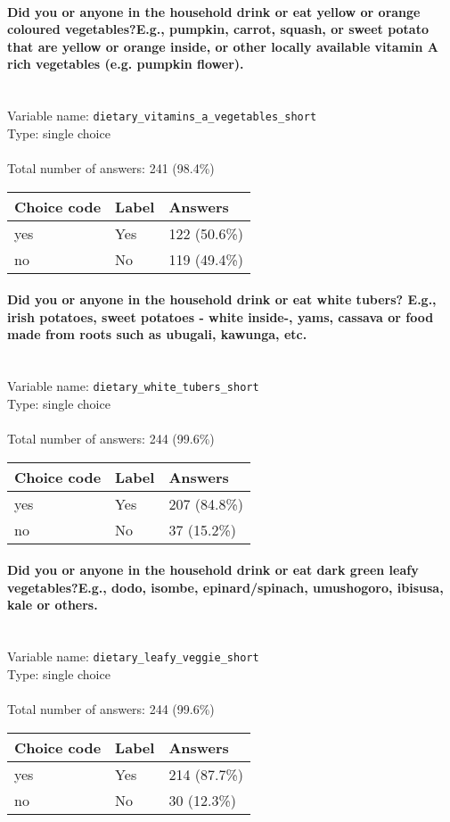 \documentclass[11.5pt, a4paper]{scrartcl}
\begin{document}
\paragraph{Did you or anyone in the household drink or eat yellow or orange coloured vegetables?E.g., pumpkin, carrot, squash, or sweet potato that are yellow or orange inside, or other locally available vitamin A rich vegetables (e.g. pumpkin flower).}
\  \\Variable name: \texttt{dietary\_vitamins\_a\_vegetables\_short}\\
Type: single choice\\
\\Total number of answers: 241 (98.4\%)
\\[0.2em] \begin{tabular}{p{4cm}|p{8cm}|p{3cm}}
Choice code & Label & Answers \\
\hline
yes & Yes& \cellcolor{color2}122 (50.6\%)\\
\cellcolor{mygray} no & \cellcolor{mygray}No & \cellcolor{color2}119 (49.4\%)\\
\end{tabular}
\paragraph{Did you or anyone in the household drink or eat white tubers? E.g., irish potatoes, sweet potatoes - white inside-, yams, cassava or food made from roots such as ubugali, kawunga, etc.}
\  \\Variable name: \texttt{dietary\_white\_tubers\_short}\\
Type: single choice\\
\\Total number of answers: 244 (99.6\%)
\\[0.2em] \begin{tabular}{p{4cm}|p{8cm}|p{3cm}}
Choice code & Label & Answers \\
\hline
yes & Yes& \cellcolor{color4}207 (84.8\%)\\
\cellcolor{mygray} no & \cellcolor{mygray}No & \cellcolor{color0}37 (15.2\%)\\
\end{tabular}
\paragraph{Did you or anyone in the household drink or eat dark green leafy vegetables?E.g., dodo, isombe, epinard/spinach, umushogoro, ibisusa, kale or others.}
\  \\Variable name: \texttt{dietary\_leafy\_veggie\_short}\\
Type: single choice\\
\\Total number of answers: 244 (99.6\%)
\\[0.2em] \begin{tabular}{p{4cm}|p{8cm}|p{3cm}}
Choice code & Label & Answers \\
\hline
yes & Yes& \cellcolor{color4}214 (87.7\%)\\
\cellcolor{mygray} no & \cellcolor{mygray}No & \cellcolor{color0}30 (12.3\%)\\
\end{tabular}
\end{document}
